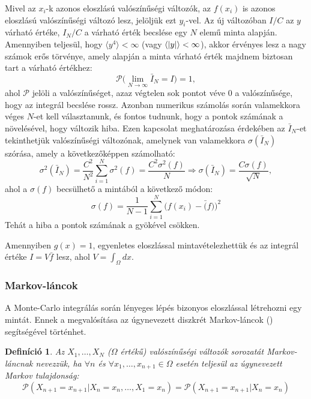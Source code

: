 \documentclass[10pt,a4paper]{article}
\numberwithin{equation}{subsection}
\numberwithin{figure}{section}
\newtheorem{definition}{Definíció}[section]
\begin{document}
Mivel az $x_i$-k azonos eloszlású valószínűségi változók, az $f(x_i)$ is azonos eloszlású valószínűségi változó lesz, jelöljük ezt $y_i$-vel. Az új változóban $I/C$ az $y$ várható értéke, $I_N/C$ a várható érték becslése egy $N$ elemű minta alapján. Amennyiben teljesül, hogy $\langle y^4\rangle<\infty$ (vagy $\langle \abs{y}\rangle<\infty$), akkor érvényes lesz a nagy számok erős törvénye, amely alapján a minta várható érték majdnem biztosan tart a várható értékhez:
\begin{equation}
\mathcal{P}\Big(\lim_{N\rightarrow\infty}\bar{I}_N=I\Big)=1,
\end{equation}
ahol $\mathcal{P}$ jelöli a valószínűséget, azaz végtelen sok pontot véve $0$ a valószínűsége, hogy az integrál becslése rossz. Azonban numerikus számolás során valamekkora véges $N$-et kell választanunk, és fontos tudnunk, hogy a pontok számának a növelésével, hogy változik hiba. Ezen kapcsolat meghatározása érdekében az $\bar{I}_{N}$-et tekinthetjük valószínűségi változónak, amelynek van valamekkora $\sigma({\bar{I}_N})$ szórása, amely a következőképpen számolható:
\begin{equation}
\sigma^2({\bar{I}_N})=\frac{C^2}{N^2}\sum_{i=1}^N\sigma^2(f)=\frac{C^2\sigma^2(f)}{N}\Longrightarrow \sigma(\bar{I}_N)=\frac{C\sigma(f)}{\sqrt{N}},
\end{equation}
ahol a $\sigma(f)$ becsülhető a mintából a következő módon:
\begin{equation}
\sigma(f)=\frac{1}{N-1}\sum_{i=1}^N\big(f(x_i)-\bar(f)\big)^2
\end{equation}
Tehát a hiba a pontok számának a gyökével csökken.

Amennyiben $g(x)=1$, egyenletes eloszlással mintavételezhettük és az integrál értéke $I=V\bar{f}$ lesz, ahol $V=\int_\Omega dx$.

\subsubsection{Markov-láncok}

A Monte-Carlo integrálás során lényeges lépés bizonyos eloszlással létrehozni egy mintát. Ennek a megvalósítása az úgynevezett diszkrét Markov-láncok (\cite{norris1998markov}) segítségével történhet. 

\begin{definition}
Az $X_1,\dots,X_N$ ($\Omega$ értékű) valószínűségi változók sorozatát Markov-láncnak nevezzük, ha $\forall n$ és $\forall x_1,\dots,x_{n+1}\in\Omega$ esetén teljesül az úgynevezett Markov tulajdonság:
\begin{equation}
\mathcal{P}(X_{n+1}=x_{n+1}|X_n=x_n,\dots,X_1=x_n)=\mathcal{P}(X_{n+1}=x_{n+1}|X_n=x_n)
\end{equation}
\end{definition}
\end{document}
